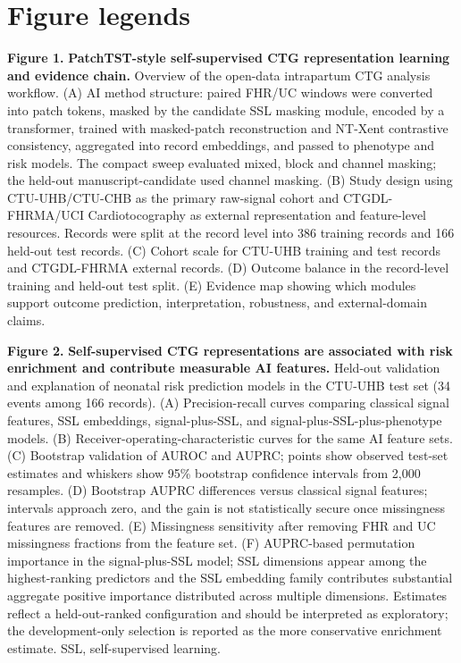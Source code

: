 \documentclass[11pt]{article}
\begin{document}
        \section*{Figure legends}
        \noindent\textbf{Figure 1.} \textbf{PatchTST-style self-supervised CTG representation learning and evidence chain.}
  Overview of the open-data intrapartum CTG analysis workflow. (A) AI method structure: paired FHR/UC windows were converted into patch tokens, masked by the candidate SSL masking module, encoded by a transformer, trained with masked-patch reconstruction and NT-Xent contrastive consistency, aggregated into record embeddings, and passed to phenotype and risk models. The compact sweep evaluated mixed, block and channel masking; the held-out manuscript-candidate used channel masking. (B) Study design using CTU-UHB/CTU-CHB as the primary raw-signal cohort and CTGDL-FHRMA/UCI Cardiotocography as external representation and feature-level resources. Records were split at the record level into 386 training records and 166 held-out test records. (C) Cohort scale for CTU-UHB training and test records and CTGDL-FHRMA external records. (D) Outcome balance in the record-level training and held-out test split. (E) Evidence map showing which modules support outcome prediction, interpretation, robustness, and external-domain claims.

\noindent\textbf{Figure 2.} \textbf{Self-supervised CTG representations are associated with risk enrichment and contribute measurable AI features.}
  Held-out validation and explanation of neonatal risk prediction models in the CTU-UHB test set (34 events among 166 records). (A) Precision-recall curves comparing classical signal features, SSL embeddings, signal-plus-SSL, and signal-plus-SSL-plus-phenotype models. (B) Receiver-operating-characteristic curves for the same AI feature sets. (C) Bootstrap validation of AUROC and AUPRC; points show observed test-set estimates and whiskers show 95\% bootstrap confidence intervals from 2,000 resamples. (D) Bootstrap AUPRC differences versus classical signal features; intervals approach zero, and the gain is not statistically secure once missingness features are removed. (E) Missingness sensitivity after removing FHR and UC missingness fractions from the feature set. (F) AUPRC-based permutation importance in the signal-plus-SSL model; SSL dimensions appear among the highest-ranking predictors and the SSL embedding family contributes substantial aggregate positive importance distributed across multiple dimensions. Estimates reflect a held-out-ranked configuration and should be interpreted as exploratory; the development-only selection is reported as the more conservative enrichment estimate. SSL, self-supervised learning.
\end{document}
